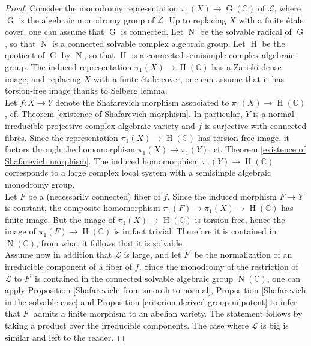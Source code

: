\documentclass[10pt,a4paper]{amsart}
\def\bC{\mathbb{C}}
\def\cL{\mathcal{L}}
\DeclareMathOperator{\rG}{G}
\DeclareMathOperator{\rH}{H}
\DeclareMathOperator{\rN}{N}
\begin{document}
\begin{proof}
Consider the monodromy representation $\pi_1(X) \to \rG(\bC)$ of $\cL$,  where $\rG$ is the algebraic monodromy group of $\cL$. Up to replacing $X$ with a finite étale cover, one can assume that $\rG$ is connected. Let $\rN$ be the solvable radical of $\rG$, so that $\rN$ is a connected solvable complex algebraic group. Let $\rH$ be the quotient of $\rG$ by $\rN$, so that $\rH$ is a connected semisimple complex algebraic group. The induced representation $\pi_1(X) \to \rH(\bC)$ has a Zariski-dense image, and replacing $X$ with a finite étale cover, one can assume that it has torsion-free image thanks to Selberg lemma. \\
Let $f \colon X \to Y$ denote the Shafarevich morphism associated to $\pi_1(X) \to \rH(\bC)$, cf. Theorem \ref{existence of Shafarevich morphism}. In particular, $Y$ is a normal irreducible projective complex algebraic variety and $f$ is surjective with connected fibres.
Since the representation $\pi_1(X) \to \rH(\bC)$ has torsion-free image, it factors through the homomorphism $\pi_1(X) \to \pi_1(Y)$, cf. Theorem \ref{existence of Shafarevich morphism}. The induced homomorphism $\pi_1(Y) \to \rH(\bC)$ corresponds to a large complex local system with a semisimple algebraic monodromy group.\\
Let $F$ be a (necessarily connected) fiber of $f$. Since the induced morphism $F \to Y$ is constant, the composite homomorphism $\pi_1(F) \to \pi_1(X) \to \rH(\bC)$ has finite image. But the image of $\pi_1(X) \to \rH(\bC)$ is torsion-free, hence the image of $\pi_1(F) \to \rH(\bC)$ is in fact trivial. Therefore it is contained in $\rN(\bC)$, from what it follows that it is solvable.\\
Assume now in addition that $\cL$ is large, and let $F^\prime$ be the normalization of an irreducible component of a fiber of $f$. Since the monodromy of the restriction of $\cL$ to $F^\prime$ is contained in the connected solvable algebraic group $\rN(\bC)$, one can apply Proposition \ref{Shafarevich: from smooth to normal}, Proposition \ref{Shafarevich in the solvable case} and Proposition \ref{criterion derived group nilpotent} to infer that $F^\prime$ admits a finite morphism to an abelian variety. The statement follows by taking a product over the irreducible components. The case where $\cL$ is big is similar and left to the reader.
\end{proof}
\end{document}
